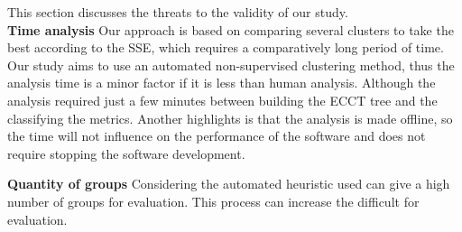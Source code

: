This section discusses the threats to the validity of our study.\\
\textbf{Time analysis}
    Our approach is based on comparing several clusters to take the best according to the SSE, which requires a comparatively long period of time. Our study aims to use an automated non-supervised clustering method, thus the analysis time is a minor factor if it is less than human analysis. Although the analysis required just a few minutes between building the ECCT tree and the classifying the metrics. Another highlights is that the analysis is made offline, so the time will not influence on the performance of the software and does not require stopping the software development.
    
\textbf{Quantity of groups}
    Considering the automated heuristic used can give a high number of groups for evaluation. This process can increase the difficult for evaluation.